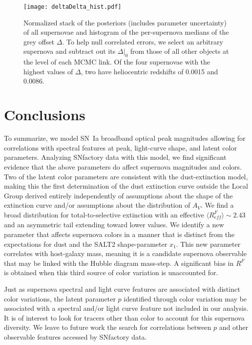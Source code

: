 \documentclass[trackchanges]{aastex62}   	%
\begin{document}
\begin{figure}[htbp] %
   \centering
   \texttt{[image: deltaDelta\_hist.pdf]} 
   \caption{
   Normalized stack of the posteriors  (includes parameter uncertainty) of all supernovae and histogram of the per-supernova medians of the grey offset $\Delta$. 
   To help null correlated errors, we select
    an arbitrary supernova and subtract out its $\Delta|_0$ from those of all other objects at the level of each MCMC link.
  Of the four
supernovae with the highest values of $\Delta$, two have 
heliocentric
redshifts of 0.0015 and 0.0086. 
   \label{hist:fig}}
\end{figure}



\section{Conclusions}
\label{conclusions:sec}
To summarize, we model SN~Ia broadband optical peak magnitudes allowing for correlations with spectral features at peak,
light-curve shape, and
latent color parameters.  Analyzing SNfactory data with this model, we find significant evidence that the above parameters do
affect supernova magnitudes and colors.  Two of the latent color parameters are consistent with the
 dust-extinction model, making this
the first determination of the dust extinction curve outside the Local Group
derived entirely independently of assumptions about the shape of the extinction curve and/or assumptions about the
distribution of $A_V$.  
We find a broad distribution for total-to-selective extinction
with an effective
$\langle R^F_{\mathit{eff}}\rangle \sim 2.43$ and an asymmetric tail extending toward lower values.
We identify a new
parameter that affects supernova
colors in a manner that is distinct from the expectations for dust
and the SALT2 shape-parameter $x_1$.
This new parameter correlates with host-galaxy mass, meaning it is a candidate supernova observable that may be linked
with the Hubble diagram mass-step.
A significant bias in $R^F$ is obtained when this third source of color variation
is unaccounted for.

Just as supernova spectral and light curve features are associated with distinct color variations, the latent parameter $p$
identified through color variation may be associated with a spectral and/or light curve feature not included
in our analysis.  It
is of interest to look for tracers other than color to account for this supernova diversity.
We leave to future work the search for correlations between $p$ and other
observable features accessed by SNfactory data.
\end{document}

